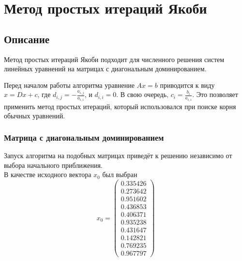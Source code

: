 \documentclass[../../report.tex]{subfiles}
\begin{document}
\chapter{Метод простых итераций Якоби}

\section{Описание}
Метод простых итераций Якоби подходит для численного решения 
систем линейных уравнений на матрицах с диагональным доминированием.

Перед началом работы алгоритма уравнение $Ax=b$ приводится к виду $x = Dx + c$,
где $d_{i,j} = - \frac{a_{i,j}}{a_{i,i}}$, и $d_{i,i} = 0$. 
В свою очередь, $c_i = \frac{b_i}{a_{i,i}}$. Это позволяет применить метод простых итераций,
который использовался при поиске корня обычных уравнений.

\subsection{Матрица с диагональным доминированием}
Запуск алгоритма на подобных матрицах приведёт к 
решению независимо от выбора начального приближения. \\
В качестве исходного вектора $x_0$ был выбран 
\[
x_0 = 
\begin{pmatrix} 
  0.335426 \\ 
  0.273642 \\ 
  0.951602 \\ 
  0.436853 \\ 
  0.406371 \\ 
  0.935238 \\ 
  0.431647 \\ 
  0.142821 \\ 
  0.769235 \\ 
  0.967797 
\end{pmatrix}
\]
\end{document}
